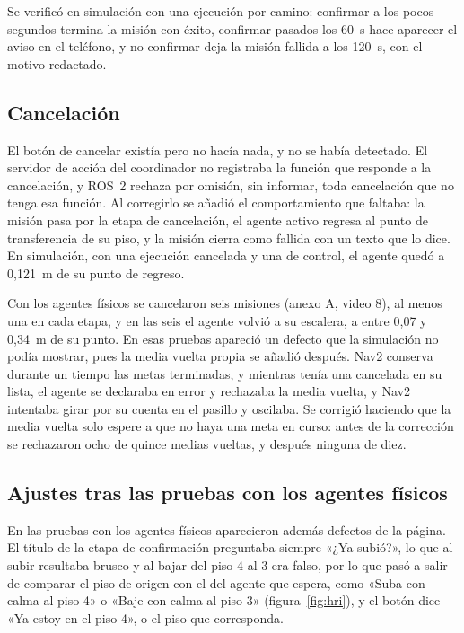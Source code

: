 Se verificó en simulación con una ejecución por camino: confirmar a los pocos segundos termina la misión con éxito, confirmar pasados los 60~s hace aparecer el aviso en el teléfono, y no confirmar deja la misión fallida a
los 120~s, con el motivo redactado.

\subsection{Cancelación}

El botón de cancelar existía pero no hacía nada, y no se había detectado. El servidor de acción del coordinador no registraba la función que responde a la cancelación, y ROS~2 rechaza por omisión, sin informar, toda
cancelación que no tenga esa función. Al corregirlo se añadió el comportamiento que faltaba: la misión pasa por la etapa de cancelación, el agente activo regresa al punto de transferencia de su piso, y la misión cierra como
fallida con un texto que lo dice. En simulación, con una ejecución cancelada y una de control, el agente quedó a 0,121~m de su punto de regreso.

Con los agentes físicos se cancelaron seis misiones (anexo A, video 8), al menos una en cada etapa, y en las seis el agente volvió a su escalera, a entre 0,07 y 0,34~m de su punto. En esas pruebas apareció un defecto que la simulación no podía mostrar, pues la media vuelta propia se añadió después. Nav2 conserva durante un tiempo las metas terminadas, y mientras tenía una cancelada en su lista, el agente se declaraba en error y rechazaba la
media vuelta, y Nav2 intentaba girar por su cuenta en el pasillo y oscilaba. Se corrigió haciendo que la media vuelta solo espere a que no haya una meta en curso: antes de la corrección se rechazaron ocho de quince
medias vueltas, y después ninguna de diez.

\subsection{Ajustes tras las pruebas con los agentes físicos}
\label{sec:ajustes-campo}

En las pruebas con los agentes físicos aparecieron además defectos de la página. El título de la etapa de confirmación preguntaba siempre «¿Ya subió?», lo que al subir resultaba brusco y al bajar del piso 4 al 3 era falso, por
lo que pasó a salir de comparar el piso de origen con el del agente que espera, como «Suba con calma al piso 4» o «Baje con calma al piso 3» (figura~\ref{fig:hri}), y el botón dice «Ya estoy en el piso 4», o el piso que
corresponda.

